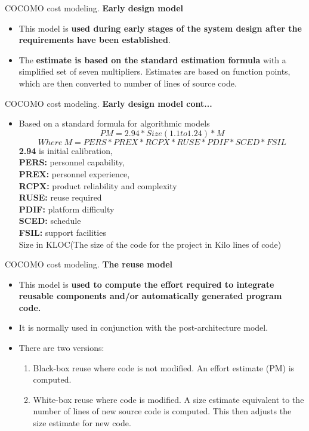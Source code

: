 \documentclass{beamer}
\begin{document}
\begin{frame}{COCOMO cost modeling. }
	\textbf{Early design model}
	\begin{itemize}
		\item  This model is \textbf{used during early stages of the system 
			design after the requirements have been established}. 
		\item The \textbf{estimate is based on the 
			standard estimation formula} with a simplified set of seven multipliers. Estimates are based on function points, 
		which are then converted to number of lines of source code.
	\end{itemize}
\end{frame}
\begin{frame}{COCOMO cost modeling. }
	\textbf{Early design model cont...}
	\begin{itemize}
		\item  Based on a standard formula for algorithmic models
		$$ PM = 2.94 * Size(1.1 to 1.24) * M $$
		$$ Where\  M = PERS * PREX * RCPX * RUSE * PDIF * SCED * FSIL $$
		\textbf{2.94} is initial calibration,\\
		\textbf{PERS:} personnel capability,\\
		\textbf{PREX:} personnel experience,\\
		\textbf{RCPX:} product reliability and complexity\\
		\textbf{RUSE:} reuse required\\
		\textbf{PDIF:} platform difficulty\\
		\textbf{SCED:} schedule\\
		\textbf{FSIL:} support facilities\\
		Size in KLOC(The size of the code for the project in Kilo lines of code)\\
	\end{itemize}
\end{frame}
\begin{frame}{COCOMO cost modeling. }
	\textbf{The reuse model}
	\begin{itemize}
		\item  This model is \textbf{used to compute the effort required to integrate 
			reusable components and/or automatically generated program code.}
		\item It is normally used in conjunction with the post-architecture model.
		\item There are two versions:
		\begin{enumerate}
			\item Black-box reuse where code is not modified. An effort estimate (PM) is computed.
			\item White-box reuse where code is modified. A size estimate equivalent to the number
			of lines of new source code is computed. This then adjusts the size estimate for new
			code.
		\end{enumerate}
	\end{itemize}
\end{frame}
\end{document}
